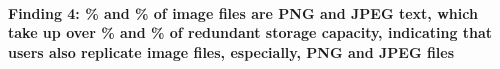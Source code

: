 \paragraph{Finding 4: \% and \% of image files are PNG and JPEG text, which take up over \% and \% of redundant storage capacity, indicating that users also replicate image files, especially, PNG and JPEG files}





